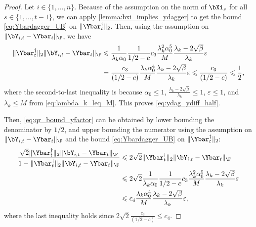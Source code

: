 \documentclass{article}
\theoremstyle{plain}
\theoremstyle{definition}
\theoremstyle{remark}
\begin{document}
\begin{proof}
  Let $i\in\{1,\dots,n\}$. Because of the assumption on the norm of $\bXi_s$ for all $s \in \{1, \dots, t-1\}$, we can apply \cref{lemma:bxi_implies_ydagger} to get the bound \eqref{eq:Ybardagger_UB} on $\Vert\Ybar_t^\dagger\Vert_2$. Then, using the assumption on $\Vert \bY_{i,t} - \Ybar_t \Vert_\F$, we have 
  \begin{align*}
    \Vert\Ybar_t^\dagger\Vert_2\Vert\bY_{i,t} - \Ybar_t\Vert_\F & \leqslant \frac{1}{\lambda_k\alpha_0}\frac{1}{1/2 - c} c_3\frac{\lambda_k^2 \alpha_0^5}{M} \frac{\lambda_k-2\sqrt{\beta}}{\lambda_k}\varepsilon \\
    & = \frac{c_3}{(1/2 - c)} \frac{\lambda_k \alpha_0^4}{M} \frac{\lambda_k-2\sqrt{\beta}}{\lambda_k}\varepsilon \leqslant \frac{c_3}{(1/2 - c)} \leqslant \frac{1}{2},
  \end{align*}
  where the second-to-last inequality is because $\alpha_0\leqslant 1$, $\frac{\lambda_k-2\sqrt{\beta}}{\lambda_k} \leqslant 1$, $\varepsilon\leqslant1$, and $\lambda_k\leqslant M$ from \eqref{eq:lambda_k_leq_M}. This proves \eqref{eq:ydag_ydiff_half}. 
  
  Then, \eqref{eq:qr_bound_yfactor} can be obtained by lower bounding the denominator by $1/2$, and upper bounding the numerator using the assumption on $\Vert\bY_{i,t} - \Ybar_t \Vert_\F$ and the bound \eqref{eq:Ybardagger_UB} on $\Vert\Ybar_t^\dagger\Vert_2$:
  \begin{align*}
    \frac{\sqrt{2}\Vert\Ybar_t^\dagger\Vert_2\Vert\bY_{i,t} - \Ybar_t\Vert_\F}{1 - \Vert\Ybar_t^\dagger\Vert_2\Vert\bY_{i,t} - \Ybar_t\Vert_\F} & \leqslant 2\sqrt{2}\Vert\Ybar_t^\dagger\Vert_2\Vert\bY_{i,t} - \Ybar_t\Vert_\F \\
    & \leqslant 2\sqrt{2} \frac{1}{\lambda_k\alpha_0}\frac{1}{1/2 - c} c_3\frac{\lambda_k^2 \alpha_0^5}{M} \frac{\lambda_k-2\sqrt{\beta}}{\lambda_k}\varepsilon \\
    & \leqslant c_4 \frac{\lambda_k\alpha_0^4}{M} \frac{\lambda_k-2\sqrt{\beta}}{\lambda_k}\varepsilon,
  \end{align*}
  where the last inequality holds since $2\sqrt{2} \frac{c_3}{(1/2 - c)} \leqslant c_4$.


\end{proof}
\end{document}
